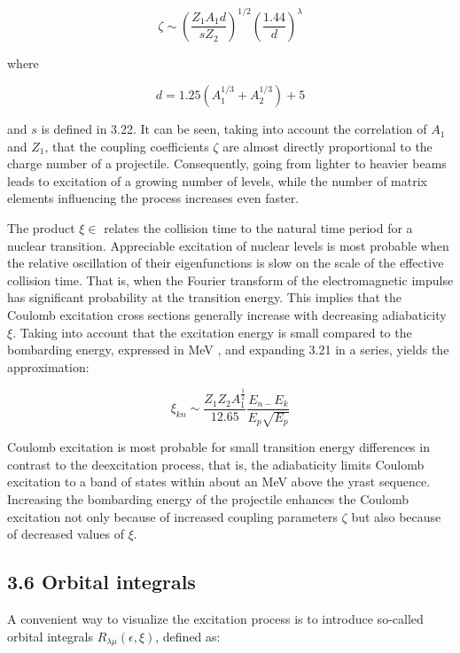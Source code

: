 \documentclass[10pt]{article}
\begin{document}
\begin{equation*}
\zeta \sim\left(\frac{Z_{1} A_{1} d}{s Z_{2}}\right)^{1 / 2}\left(\frac{1.44}{d}\right)^{\lambda} \tag{3.35}
\end{equation*}


where


\begin{equation*}
d=1.25\left(A_{1}^{1 / 3}+A_{2}^{1 / 3}\right)+5 \tag{3.36}
\end{equation*}


and $s$ is defined in 3.22. It can be seen, taking into account the correlation of $A_{1}$ and $Z_{1}$, that the coupling coefficients $\zeta$ are almost directly proportional to the charge number of a projectile. Consequently, going from lighter to heavier beams leads to excitation of a growing number of levels, while the number of matrix elements influencing the process increases even faster.

The product $\xi \in$ relates the collision time to the natural time period for a nuclear transition. Appreciable excitation of nuclear levels is most probable when the relative oscillation of their eigenfunctions is slow on the scale of the effective collision time. That is, when the Fourier transform of the electromagnetic impulse has significant probability at the transition energy. This implies that the Coulomb excitation cross sections generally increase with decreasing adiabaticity $\xi$. Taking into account that the excitation energy is small compared to the bombarding energy, expressed in MeV , and expanding 3.21 in a series, yields the approximation:


\begin{equation*}
\xi_{k n} \sim \frac{Z_{1} Z_{2} A_{1}^{\frac{1}{2}}}{12.65} \frac{E_{n-} E_{k}}{E_{p} \sqrt{E_{p}}} \tag{3.37}
\end{equation*}


Coulomb excitation is most probable for small transition energy differences in contrast to the deexcitation process, that is, the adiabaticity limits Coulomb excitation to a band of states within about an MeV above the yrast sequence. Increasing the bombarding energy of the projectile enhances the Coulomb excitation not only because of increased coupling parameters $\zeta$ but also because of decreased values of $\xi$.

\subsection*{3.6 Orbital integrals}
A convenient way to visualize the excitation process is to introduce so-called orbital integrals $R_{\lambda \mu}(\epsilon, \xi)$, defined as:
\end{document}
